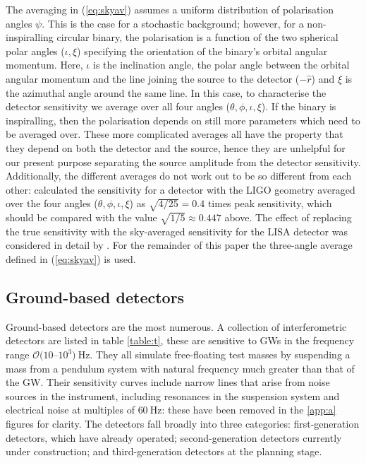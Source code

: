 The averaging in (\ref{eq:skyav}) assumes a uniform distribution of polarisation angles $\psi$. This is the case for a stochastic background; however, for a non-inspiralling circular binary, the polarisation is a function of the two spherical polar angles ($\iota,\xi$) specifying the orientation of the binary's orbital angular momentum. Here, $\iota$ is the inclination angle, the polar angle between the orbital angular momentum and the line joining the source to the detector ($-\hat{r}$) and $\xi$ is the azimuthal angle around the same line. In this case, to characterise the detector sensitivity we average over all four angles ($\theta,\phi,\iota,\xi$). If the binary is inspiralling, then the polarisation depends on still more parameters which need to be averaged over. These more complicated averages all have the property that they depend on both the detector and the source, hence they are unhelpful for our present purpose separating the source amplitude from the detector sensitivity. Additionally, the different averages do not work out to be so different from each other: \citet{1993PhRvD..47.2198F} calculated the sensitivity for a detector with the LIGO geometry averaged over the four angles ($\theta,\phi,\iota,\xi$) as $\sqrt{4/25}=0.4$ times peak sensitivity, which should be compared with the value $\sqrt{1/5}\approx 0.447$ above. The effect of replacing the true sensitivity with the sky-averaged sensitivity for the LISA detector was considered in detail by \cite{2012CQGra..29l4015V}. For the remainder of this paper the three-angle average defined in (\ref{eq:skyav}) is used.

\subsection{Ground-based detectors}\label{sec:ground}

Ground-based detectors are the most numerous. A collection of interferometric detectors are listed in table \ref{table:t}, these are sensitive to GWs in the frequency range ${\mathcal{O}}(10$--$10^{3})~\mathrm{Hz}$. They all simulate free-floating test masses by suspending a mass from a pendulum system with natural frequency much greater than that of the GW. Their sensitivity curves include narrow lines that arise from noise sources in the instrument, including resonances in the suspension system and electrical noise at multiples of $60~\mathrm{Hz}$: these have been removed in the \ref{app:a} figures for clarity. The detectors fall broadly into three categories: first-generation detectors, which have already operated; second-generation detectors currently under construction; and third-generation detectors at the planning stage. 

